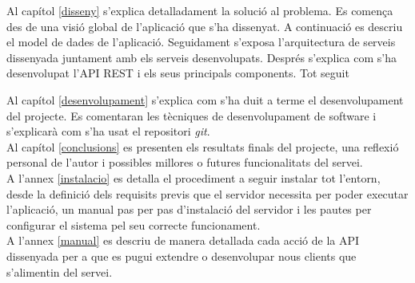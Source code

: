 Al capítol \ref{disseny} s'explica detalladament la solució al problema. Es comença des de una visió global de l'aplicació que s'ha dissenyat. A continuació es descriu el model de dades de l'aplicació. Seguidament s'exposa l'arquitectura de serveis dissenyada juntament amb els serveis desenvolupats. Després s'explica com s'ha desenvolupat l'\ac{API} \ac{REST} i els seus principals components. Tot seguit 

Al capítol \ref{desenvolupament} s'explica com s'ha duit a terme el desenvolupament del projecte. Es comentaran les tècniques de desenvolupament de software i s'explicarà com s'ha usat el repositori \emph{git}.\\

Al capítol \ref{conclusions} es presenten els resultats finals del projecte, una reflexió personal de l'autor i possibles millores o futures funcionalitats del servei. \\

A l'annex \ref{instalacio} es detalla el procediment a seguir instalar tot l'entorn, desde la definició dels requisits previs que el servidor necessita per poder executar l'aplicació, un manual pas per pas d'instalació del servidor i les pautes per configurar el sistema pel seu correcte funcionament.\\

A l'annex \ref{manual} es descriu de manera detallada cada acció de la API dissenyada per a que es pugui extendre o desenvolupar nous clients que s'alimentin del servei. \\

